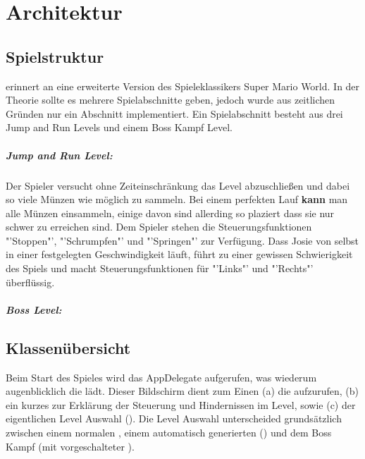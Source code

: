 \chapter{Architektur}\label{ch:arch}

\section{Spielstruktur}\label{sec:3_Spielstruktur}
\gamename  erinnert an eine erweiterte Version des Spieleklassikers Super Mario World.
In der Theorie sollte es mehrere Spielabschnitte geben, jedoch wurde aus zeitlichen Gründen nur ein Abschnitt implementiert. Ein Spielabschnitt besteht aus drei Jump and Run Levels und einem Boss Kampf Level. 

\paragraph{Jump and Run Level:}
Der Spieler versucht ohne Zeiteinschränkung das Level abzuschließen und dabei so viele Münzen wie möglich zu sammeln. Bei einem perfekten Lauf \textbf{kann} man alle Münzen einsammeln, einige davon sind allerding so plaziert dass sie nur schwer zu erreichen sind.
Dem Spieler stehen die Steuerungsfunktionen "'Stoppen"', "'Schrumpfen"' und "'Springen"' zur Verfügung. 
Dass Josie von selbst in einer festgelegten Geschwindigkeit läuft, führt zu einer gewissen Schwierigkeit des Spiels und macht Steuerungsfunktionen für "'Links"' und "'Rechts"' überflüssig.

\paragraph{Boss Level:}



\section{Klassenübersicht}\label{sec:3_Klassenuebersicht}

Beim Start des Spieles wird das AppDelegate aufgerufen, was wiederum augenblicklich die  lädt. Dieser Bildschirm dient zum Einen (a) die  aufzurufen, (b) ein kurzes  zur Erklärung der Steuerung und Hindernissen im Level, sowie (c) der eigentlichen Level Auswahl ().
Die Level Auswahl unterscheided grundsätzlich zwischen einem normalen , einem automatisch generierten () und dem Boss Kampf (mit vorgeschalteter ).

